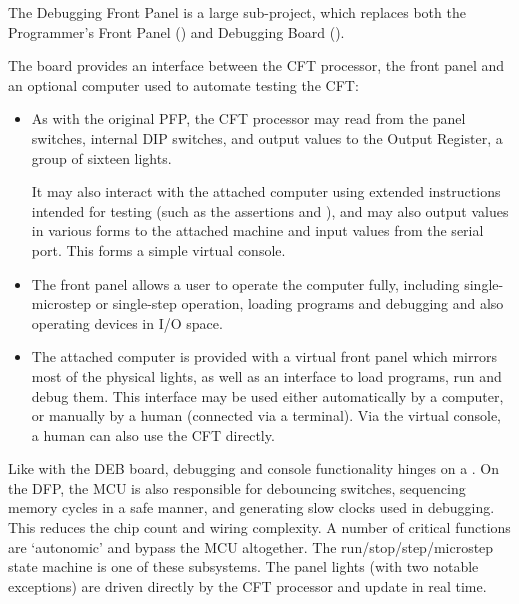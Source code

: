 

\label{chap:hard-dfp}

The Debugging Front Panel is a large sub-project, which replaces both
the Programmer's Front Panel () and Debugging
Board ().

The board provides an interface between
the CFT processor, the front panel and an optional computer used to
automate testing the CFT:

\begin{itemize}
\item As with the original PFP, the CFT processor may read from the
  panel switches, internal DIP switches, and output values to the
  Output Register, a group of sixteen lights.

  It may also interact with the attached computer using extended
  instructions intended for testing (such as the assertions
   and ), and may also output values in various
  forms to the attached machine and input values from the serial
  port. This forms a simple virtual console.

\item The front panel allows a user to operate the computer fully,
  including single-microstep or single-step operation, loading
  programs and debugging and also operating devices in I/O space. 

\item The attached computer is provided with a virtual front panel
  which mirrors most of the physical lights, as well as an interface
  to load programs, run and debug them. This interface may be used
  either automatically by a computer, or manually by a human
  (connected via a terminal). Via the virtual console, a human can
  also use the CFT directly.
\end{itemize}

Like with the DEB board, debugging and console functionality hinges on
a . On the DFP, the MCU is also responsible for debouncing
switches, sequencing memory cycles in a safe manner, and generating
slow clocks used in debugging. This reduces the chip count and wiring
complexity. A number of critical functions are ‘autonomic’ and bypass
the MCU altogether. The run/stop/step/microstep state machine is one
of these subsystems. The panel lights (with two notable exceptions)
are driven directly by the CFT processor and update in real time.

